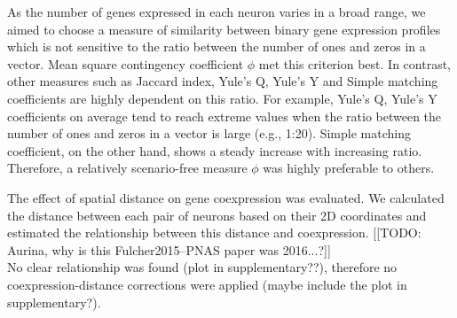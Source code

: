 \documentclass[10pt,letterpaper]{article}
\begin{document}
As the number of genes expressed in each neuron varies in a broad range, we aimed to choose a measure of similarity between binary gene expression profiles which is not sensitive to the ratio between the number of ones and zeros in a vector.
Mean square contingency coefficient $\phi$ met this criterion best.
In contrast, other measures such as Jaccard index, Yule's Q, Yule's Y and Simple matching coefficients are highly dependent on this ratio.
For example, Yule's Q, Yule's Y coefficients on average tend to reach extreme values when the ratio between the number of ones and zeros in a vector is large (e.g., 1:20).
Simple matching coefficient, on the other hand, shows a steady increase with increasing ratio.
Therefore, a relatively scenario-free measure $\phi$ was highly preferable to others.

The effect of spatial distance on gene coexpression \cite{Fulcher2015} was evaluated.
We calculated the distance between each pair of neurons based on their 2D coordinates and estimated the relationship between this distance and coexpression.
[[TODO: Aurina, why is this Fulcher2015--PNAS paper was 2016...?]]\\
No clear relationship was found (plot in supplementary??), therefore no coexpression-distance corrections were applied (maybe include the plot in supplementary?).
\end{document}
